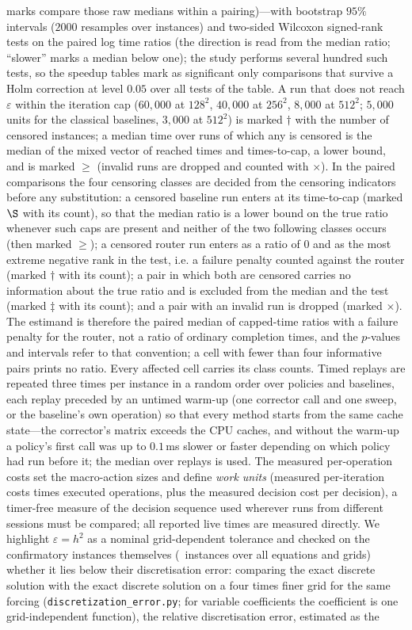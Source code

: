 marks compare those raw medians within a pairing)---with bootstrap $95\%$ intervals ($2000$ resamples over instances) and two-sided Wilcoxon signed-rank tests on the paired log time ratios (the direction is read from the median ratio; ``slower'' marks a median below one); the study performs several hundred such tests, so the speedup tables mark as significant only comparisons that survive a Holm correction at level $0.05$ over all tests of the table. A run that does not reach $\varepsilon$ within the iteration cap ($60{,}000$ at $128^2$, $40{,}000$ at $256^2$, $8{,}000$ at $512^2$; $5{,}000$ units for the classical baselines, $3{,}000$ at $512^2$) is marked $\dagger$ with the number of censored instances; a median time over runs of which any is censored is the median of the mixed vector of reached times and times-to-cap, a lower bound, and is marked $\geq$ (invalid runs are dropped and counted with $\times$). In the paired comparisons the four censoring classes are decided from the censoring indicators before any substitution: a censored baseline run enters at its time-to-cap (marked $\S$ with its count), so that the median ratio is a lower bound on the true ratio whenever such caps are present and neither of the two following classes occurs (then marked $\geq$); a censored router run enters as a ratio of $0$ and as the most extreme negative rank in the test, i.e. a failure penalty counted against the router (marked $\dagger$ with its count); a pair in which both are censored carries no information about the true ratio and is excluded from the median and the test (marked $\ddagger$ with its count); and a pair with an invalid run is dropped (marked $\times$). The estimand is therefore the paired median of capped-time ratios with a failure penalty for the router, not a ratio of ordinary completion times, and the $p$-values and intervals refer to that convention; a cell with fewer than four informative pairs prints no ratio. Every affected cell carries its class counts. Timed replays are repeated three times per instance in a random order over policies and baselines, each replay preceded by an untimed warm-up (one corrector call and one sweep, or the baseline's own operation) so that every method starts from the same cache state---the corrector's matrix exceeds the CPU caches, and without the warm-up a policy's first call was up to $0.1$\,ms slower or faster depending on which policy had run before it; the median over replays is used. The measured per-operation costs set the macro-action sizes and define \emph{work units} (measured per-iteration costs times executed operations, plus the measured decision cost per decision), a timer-free measure of the decision sequence used wherever runs from different sessions must be compared; all reported live times are measured directly. We highlight $\varepsilon = h^2$ as a nominal grid-dependent tolerance and checked on the confirmatory instances themselves (\caDiscN\ instances over all equations and grids) whether it lies below their discretisation error: comparing the exact discrete solution with the exact discrete solution on a four times finer grid for the same forcing (\texttt{discretization\_error.py}; for variable coefficients the coefficient is one grid-independent function), the relative discretisation error, estimated as the 